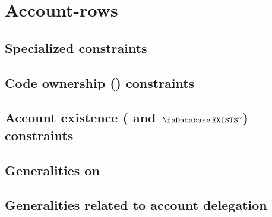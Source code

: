 \section{Account-rows}
\subsection{Specialized constraints                                           }    \label{hub: account: state access}               %
\subsection{Code ownership (\accHasCode) constraints                          \lispDone{}}    \label{hub: account: empty code}                
\subsection{Account existence (\accExists{} and $\accExists\new$) constraints \lispDone{}}    \label{hub: account: account existence}         
\subsection{Generalities on \accRomLexFlag{}                                  }    \label{hub: account: rom lex flag generalities}  %
\subsection{Generalities related to account delegation                        }    \label{hub: account: account delegation}         %
